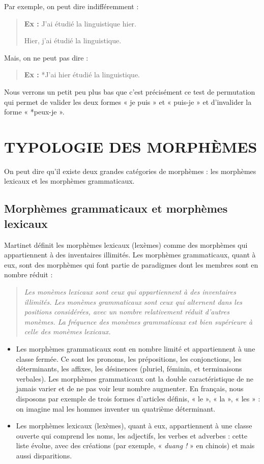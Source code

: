 Par exemple, on peut dire indifféremment :
\begin{quote}
\textbf{Ex :} J’ai étudié la linguistique hier.

\hspace{1.8em}Hier, j’ai étudié la linguistique.
\end{quote}
Mais, on ne peut pas dire :
\begin{quote}
\textbf{Ex :} *J’ai hier étudié la linguistique.
\end{quote}
Nous verrons un petit peu plus bas que c’est précisément ce test de permutation qui permet de valider les deux formes « je puis » et « puis-je » et d’invalider la forme « *peux-je ».

\section{TYPOLOGIE DES MORPHÈMES}
On peut dire qu’il existe deux grandes catégories de morphèmes : les morphèmes lexicaux et les morphèmes grammaticaux.

\subsection{Morphèmes grammaticaux et morphèmes lexicaux}
Martinet définit les morphèmes lexicaux (lexèmes) comme des morphèmes qui appartiennent à des inventaires illimités. Les morphèmes grammaticaux, quant à eux, sont des morphèmes qui font partie de paradigmes dont les membres sont en nombre réduit :
\begin{quote}\small\itshape
Les monèmes lexicaux sont ceux qui appartiennent à des inventaires illimités. Les monèmes grammaticaux sont ceux qui alternent dans les positions considérées, avec un nombre relativement réduit d’autres monèmes. La fréquence des monèmes grammaticaux est bien supérieure à celle des monèmes lexicaux.
\end{quote}
\begin{itemize}
\item Les morphèmes grammaticaux sont en nombre limité et appartiennent à une classe fermée. Ce sont les pronoms, les prépositions, les conjonctions, les déterminants, les affixes, les désinences (pluriel, féminin, et terminaisons verbales). Les morphèmes grammaticaux ont la double caractéristique de ne jamais varier et de ne pas voir leur nombre augmenter. En français, nous disposons par exemple de trois formes d’articles définis, « le », « la », « les » : on imagine mal les hommes inventer un quatrième déterminant.
\item Les morphèmes lexicaux (lexèmes), quant à eux, appartiennent à une classe ouverte qui comprend les noms, les adjectifs, les verbes et adverbes : cette liste évolue, avec des créations (par exemple, « \textit{duang !} » en chinois) et mais aussi disparitions.
\end{itemize}

